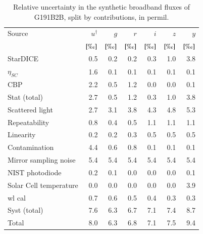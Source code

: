 \begin{table}
  \centering
  \caption{Relative uncertainty in the synthetic broadband fluxes of
    G191B2B, split by contributions, in permil.}
  \label{tab:budget}
  \begin{tabular}{lrrrrrr}
    \toprule
    \toprule
    Source & $u^\dag$ & $g$ & $r$ & $i$ & $z$ & $y$ \\
    & $[\text{\textperthousand}]$ & $[\text{\textperthousand}]$ & $[\text{\textperthousand}]$ & $[\text{\textperthousand}]$ & $[\text{\textperthousand}]$ & $[\text{\textperthousand}]$\\
    \midrule
    StarDICE & 0.5 & 0.2 & 0.2 & 0.3 & 1.0 & 3.8 \\
    $\eta_{SC}$ & 1.6 & 0.1 & 0.1 & 0.1 & 0.1 & 0.1 \\
    CBP & 2.2 & 0.5 & 1.2 & 0.0 & 0.0 & 0.1 \\
    \midrule
    Stat (total) & 2.7 & 0.5 & 1.2 & 0.3 & 1.0 & 3.8 \\
    \midrule
    Scattered light & 2.7 & 3.1 & 3.8 & 4.3 & 4.8 & 5.3 \\
    Repeatability & 0.8 & 0.4 & 0.5 & 1.1 & 1.1 & 1.1 \\
    Linearity & 0.2 & 0.2 & 0.3 & 0.5 & 0.5 & 0.5 \\
    Contamination & 4.4 & 0.6 & 0.8 & 0.1 & 0.1 & 0.1 \\
    Mirror sampling noise & 5.4 & 5.4 & 5.4 & 5.4 & 5.4 & 5.4 \\
    NIST photodiode & 0.2 & 0.1 & 0.0 & 0.0 & 0.0 & 0.1 \\
    Solar Cell temperature & 0.0 & 0.0 & 0.0 & 0.0 & 0.0 & 3.9 \\
    wl cal & 0.7 & 0.6 & 0.5 & 0.4 & 0.3 & 0.3 \\
    \midrule
    Syst (total) & 7.6 & 6.3 & 6.7 & 7.1 & 7.4 & 8.7 \\
    \midrule
    Total & 8.0 & 6.3 & 6.8 & 7.1 & 7.5 & 9.4 \\
    \bottomrule
  \end{tabular}
\end{table}

